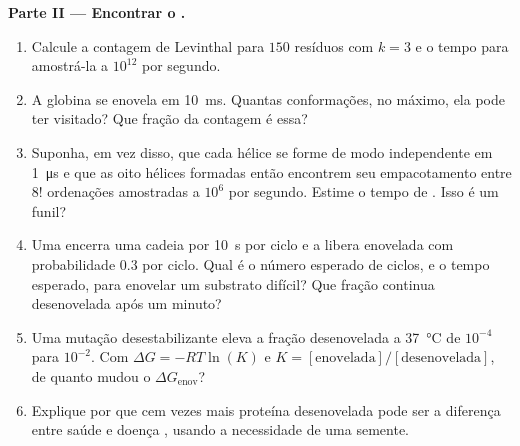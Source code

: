 \begin{problem}
\medskip
\noindent\textbf{Parte II --- Encontrar o .}
\begin{enumerate}[resume]
  \item Calcule a contagem de Levinthal para $150$ resíduos com $k = 3$
        e o tempo para amostrá-la a $10^{12}$ por segundo.
  \item A globina se enovela em \qty{10}{ms}. Quantas conformações, no
        máximo, ela pode ter visitado? Que fração da contagem é essa?
  \item Suponha, em vez disso, que cada hélice se forme de modo
        independente em \qty{1}{\micro s} e que as oito hélices
        formadas então encontrem seu empacotamento entre $8!$
        ordenações amostradas a $10^{6}$ por segundo. Estime o tempo de
        . Isso é um funil?
  \item Uma  encerra uma cadeia por \qty{10}{s} por ciclo e
        a libera enovelada com probabilidade $0.3$ por ciclo. Qual é o
        número esperado de ciclos, e o tempo esperado, para enovelar um
        substrato difícil? Que fração continua desenovelada após um
        minuto?
  \item Uma mutação desestabilizante eleva a fração desenovelada a
        \qty{37}{\celsius} de $10^{-4}$ para $10^{-2}$. Com
        $\Delta G =
        -RT\ln(K)$ e $K = [\text{enovelada}]/[\text{desenovelada}]$,
        de quanto mudou o $\Delta G_{\text{enov}}$?
  \item Explique por que cem vezes mais proteína desenovelada pode ser a
        diferença entre saúde e doença , usando a necessidade
        de uma semente.
\end{enumerate}


\end{problem}
